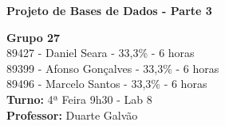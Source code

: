 \documentclass[12pt]{report}
\begin{document}
    \begin{titlepage}
        \begin{center}

            \vspace*{\fill}
            \Huge
            \textbf{Projeto de Bases de Dados - Parte 3}

            \vspace*{\fill}

            \Large
            \textbf{Grupo 27} \\
            89427 - Daniel Seara - 33,3\% - 6 horas \\
            89399 - Afonso Gonçalves - 33,3\% - 6 horas \\
            89496 - Marcelo Santos - 33,3\% - 6 horas \\

            \bigskip
            \textbf{Turno:} 4ª Feira 9h30 - Lab 8\\ \textbf{Professor:} Duarte Galvão

        \end{center}
    \end{titlepage}
\end{document}
